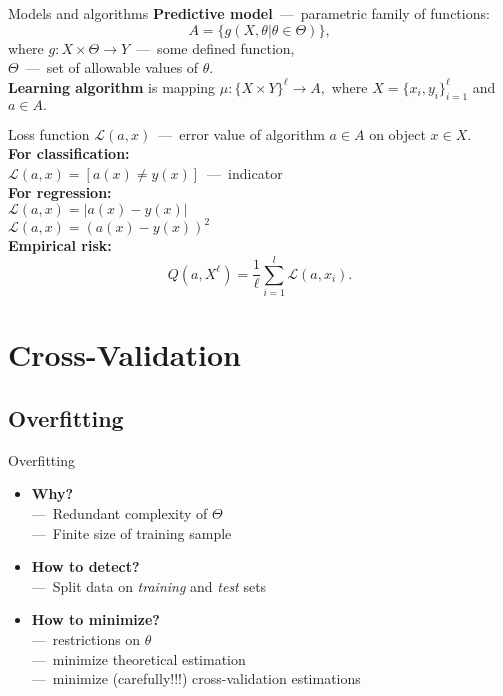 \documentclass{beamer}
\begin{document}
\begin{frame}{Models and algorithms}
\textbf{Predictive model}~---~parametric family of functions:
$$A=\{g(X,\theta | \theta\in\Theta)\},$$
where $g: X\times \Theta \rightarrow Y$~---~some defined function,\\
$\Theta$~---~set of allowable values of $\theta.$\\
\bigskip
\bigskip
\bigskip
\textbf{Learning algorithm} is mapping
$\mu : \{ X\times Y \}^\ell \rightarrow A,$
where $X=\{x_i,y_i\}_{i=1}^{\ell}$ and $a\in A.$
\end{frame}

\begin{frame}{Loss function}
$\mathcal{L}(a,x)$~---~error value of algorithm $a\in A$ on object $x\in X.$\\
\medskip
\textbf{For classification:}\\
$\mathcal{L}(a,x) = [a(x)\neq y(x)]$~---~indicator\\
\medskip
\textbf{For regression:}\\
$\mathcal{L}(a,x) = |a(x) - y(x)|$\\
$\mathcal{L}(a,x) = (a(x) - y(x))^2$\\
\medskip
\textbf{Empirical risk:}\\
$$Q(a,X^\ell) = \frac{1}{\ell}\sum_{i=1}^{l}\mathcal{L}(a,x_i).$$
\end{frame}


\section{Cross-Validation}
\subsection{Overfitting}
\begin{frame}{Overfitting}
    \begin{itemize}
    \item \textbf{Why?}\\
    ---~Redundant complexity of $\Theta$\\
    ---~Finite size of training sample
    \item \textbf{How to detect?}\\
    ---~Split data on \textit{training} and \textit{test} sets
    \item \textbf{How to minimize?}\\
    ---~restrictions on $\theta$\\
    ---~minimize theoretical estimation\\
    ---~minimize (carefully!!!) cross-validation estimations
    \end{itemize}
\end{frame}
\end{document}
